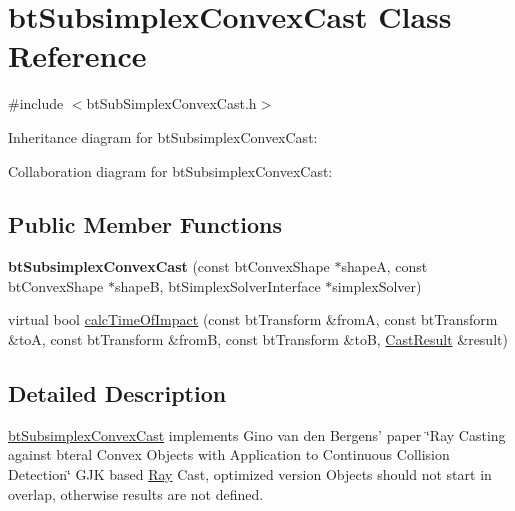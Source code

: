 \hypertarget{classbt_subsimplex_convex_cast}{\section{bt\+Subsimplex\+Convex\+Cast Class Reference}
\label{classbt_subsimplex_convex_cast}
}


{\ttfamily \#include $<$bt\+Sub\+Simplex\+Convex\+Cast.\+h$>$}



Inheritance diagram for bt\+Subsimplex\+Convex\+Cast\+:


Collaboration diagram for bt\+Subsimplex\+Convex\+Cast\+:
\subsection*{Public Member Functions}
\begin{DoxyCompactItemize}
\item 
\hypertarget{classbt_subsimplex_convex_cast_a30fb126456a82b5fe625da26c6a28900}{{\bfseries bt\+Subsimplex\+Convex\+Cast} (const bt\+Convex\+Shape $\ast$shape\+A, const bt\+Convex\+Shape $\ast$shape\+B, bt\+Simplex\+Solver\+Interface $\ast$simplex\+Solver)}\label{classbt_subsimplex_convex_cast_a30fb126456a82b5fe625da26c6a28900}

\item 
virtual bool \hyperlink{classbt_subsimplex_convex_cast_a93202199b82c9d2f3074617f8db72e17}{calc\+Time\+Of\+Impact} (const bt\+Transform \&from\+A, const bt\+Transform \&to\+A, const bt\+Transform \&from\+B, const bt\+Transform \&to\+B, \hyperlink{structbt_convex_cast_1_1_cast_result}{Cast\+Result} \&result)
\end{DoxyCompactItemize}


\subsection{Detailed Description}
\hyperlink{classbt_subsimplex_convex_cast}{bt\+Subsimplex\+Convex\+Cast} implements Gino van den Bergens' paper \char`\"{}\+Ray Casting against bteral Convex Objects with Application to Continuous Collision Detection\char`\"{} G\+J\+K based \hyperlink{class_ray}{Ray} Cast, optimized version Objects should not start in overlap, otherwise results are not defined. 

